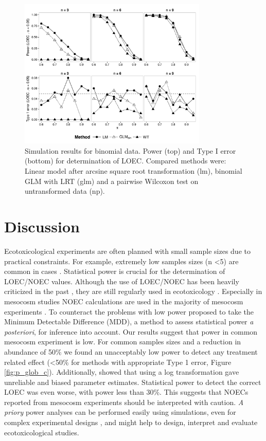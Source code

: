 \documentclass{scrartcl}
\begin{document}
\begin{figure}[h]
  \centering
  \includegraphics[width = 0.8\textwidth]{p_loec_p.pdf}
  \caption{Simulation results for binomial data. Power (top) and Type I error (bottom) for determination of LOEC. Compared methods were: Linear model after arcsine square root transformation (lm), binomial GLM with LRT (glm) and a pairwise Wilcoxon test on untransformed data (np).}
  \label{fig:p_loec_p}
\end{figure}



\newpage
\section{Discussion}

Ecotoxicological experiments are often planned with small sample sizes due to practical constraints. 
For example, extremely low samples sizes (n \textless 5) are common in cases \citep{sanderson_pesticide_2002,szocs_analysing_2015}.
Statistical power is crucial for the determination of LOEC/NOEC values.
Although the use of LOEC/NOEC has been heavily criticized in the past \citep{landis_well_2011},  they are still regularly used in ecotoxicology \citep{jager_bad_2012}.
Especially in mesocosm studies NOEC calculations are used in the majority of mesocosm experiments \citep{brock_minimum_2015,efsa_ppr_guidance_2013}.
To counteract the problems with low power \citet{brock_minimum_2015} proposed to take the Minimum Detectable Difference (MDD), a method to assess statistical power \emph{a posteriori}, for inference into account.
Our results suggest that power in common mesocosm experiment is low.
For common samples sizes and a reduction in abundance of 50\% we found an unacceptably low power to detect any treatment related effect (\textless 50\% for methods with appropriate Type 1 error, Figure \ref{fig:p_glob_c}).
Additionally, \citet{ohara_not_2010} showed that using a log transformation gave unreliable and biased parameter estimates.
Statistical power to detect the correct LOEC was even worse, with power less than 30\%.
This suggests that NOECs reported from mesocosm experiments should be interpreted with caution. 
\emph{A priory} power analyses can be performed easily using simulations, even for complex experimental designs \citep{johnson_power_2014}, and might help to design, interpret and evaluate ecotoxicological studies.
\end{document}

